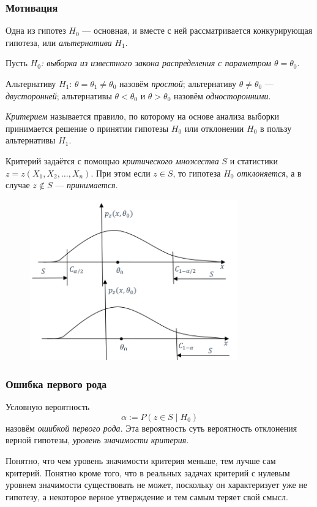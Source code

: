 \subsubsection{Мотивация}
Одна из гипотез $ H_0 $ --- основная, и вместе с ней рассматривается
конкурирующая гипотеза, или \emph{альтернатива} $ H_1 $.

\begin{definition}
Пусть \emph{$ H_0 $: выборка из известного закона распределения с параметром $
\theta = \theta_0 $}.

Альтернативу $ H_1 $: $ \theta = \theta_1 \neq \theta_0 $ назовём
\emph{простой}; альтернативу $ \theta \neq \theta_0 $ --- \emph{двусторонней};
альтернативы $ \theta < \theta_0 $ и $ \theta > \theta_0 $ назовём
\emph{односторонними}.
\end{definition}

\sloppypar
\begin{definition}
\emph{Критерием} называется правило, по которому на основе анализа выборки принимается решение о принятии
гипотезы $H_0$ или отклонении $ H_0 $ в пользу альтернативы $ H_1 $. 
\end{definition}
Критерий задаётся с помощью \emph{критического множества} $ S $ и статистики $ z
= z(X_1, X_2, \ldots, X_n)$. При этом если $ z \in S $, то гипотеза $ H_0 $
\textsl{отклоняется}, а в случае $ z \notin S$ --- \textsl{принимается}.

\begin{figure}[h!]
	\centering
	\includegraphics[width=0.8\textwidth]{Figures/9-plot1.png}
	\caption{}
	\label{fig:9-plot1-png}
\end{figure}

\subsubsection{Ошибка первого рода}
\begin{definition}
	Условную вероятность 
	\[
			\alpha := P(z\in S \mid H_0)
	\]
назовём \emph{ошибкой первого рода}. Эта вероятность суть вероятность отклонения
верной гипотезы, \emph{уровень значимости критерия}.
\end{definition}
Понятно, что чем уровень значимости критерия меньше, тем лучше сам критерий.
Понятно кроме того, что в реальных задачах критерий с нулевым уровнем
значимости существовать не может, поскольку он характеризует уже не гипотезу, а
некоторое верное утверждение и тем
самым теряет свой смысл.
 

